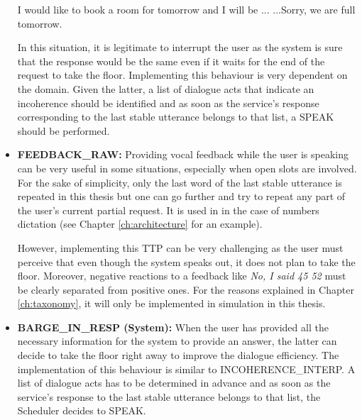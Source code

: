 \begin{itemize}
					\begin{dialogue}
						 I would like to book a room for tomorrow and I will be ...
						 ...Sorry, we are full tomorrow.
					\end{dialogue}
					
					In this situation, it is legitimate to interrupt the user as the system is sure that the response would be the same even if it waits for the end of the request to take the floor. Implementing this behaviour is very dependent on the domain. Given the latter, a list of dialogue acts that indicate an incoherence should be identified and as soon as the service's response corresponding to the last stable utterance belongs to that list, a SPEAK should be performed.
					
     \item \textbf{FEEDBACK\_RAW:} Providing vocal feedback while the user is speaking can be very useful in some situations, especially when open slots are involved. For the sake of simplicity, only the last word of the last stable utterance is repeated in this thesis but one can go further and try to repeat any part of the user's current partial request. It is used in \cite{Skantze2009,Khouzaimi2014a} in the case of numbers dictation (see Chapter \ref{ch:architecture} for an example).
			
				However, implementing this TTP can be very challenging as the user must perceive that even though the system speaks out, it does not plan to take the floor. Moreover, negative reactions to a feedback like \textit{No, I said 45 52} must be clearly separated from positive ones. For the reasons explained in Chapter \ref{ch:taxonomy}, it will only be implemented in simulation in this thesis.
				
     \item \textbf{BARGE\_IN\_RESP (System):} When the user has provided all the necessary information for the system to provide an answer, the latter can decide to take the floor right away to improve the dialogue efficiency. The implementation of this behaviour is similar to INCOHERENCE\_INTERP. A list of dialogue acts has to be determined in advance and as soon as the service's response to the last stable utterance belongs to that list, the Scheduler decides to SPEAK.
			

\end{itemize}
